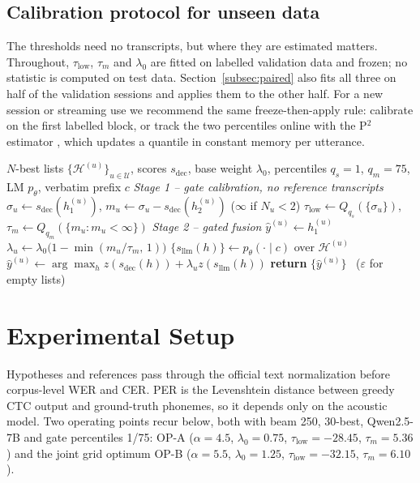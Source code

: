 \documentclass[conference,a4paper,10pt]{IEEEtran}
\begin{document}
\subsection{Calibration protocol for unseen data}\label{subsec:calib}
The thresholds need no transcripts, but where they are estimated matters.
Throughout, $\tau_{\text{low}}$, $\tau_m$ and $\lambda_0$ are fitted on labelled
validation data and frozen; no statistic is computed on test data.
Section~\ref{subsec:paired} also fits all three on half of the validation
sessions and applies them to the other half. For a new session or streaming use we
recommend the same freeze-then-apply rule: calibrate on the first labelled
block, or track the two percentiles online with the P$^2$ estimator
\cite{jain1985p2}, which updates a quantile in constant memory per utterance.

\begin{algorithm}[!t]
\caption{Gated, margin-adaptive LLM score fusion}
\label{alg:fusion}
\footnotesize
\begin{algorithmic}[1]
\Require $N$-best lists $\{\mathcal{H}^{(u)}\}_{u\in\mathcal{U}}$, scores
         $s_{\text{dec}}$, base weight $\lambda_0$, percentiles $q_s{=}1$,
         $q_m{=}75$, LM $p_\theta$, verbatim prefix $c$
\Statex \textit{Stage 1 -- gate calibration, no reference transcripts}
  $\sigma_u \!\gets\! s_{\text{dec}}(h_1^{(u)})$,
  $m_u \!\gets\! \sigma_u\!-\!s_{\text{dec}}(h_2^{(u)})$ ($\infty$ if $N_u{<}2$)
\EndFor
\State $\tau_{\text{low}} \gets Q_{q_s}(\{\sigma_u\})$,\quad
       $\tau_m \gets Q_{q_m}(\{m_u : m_u<\infty\})$
\Statex \textit{Stage 2 -- gated fusion}
     \State $\hat{y}^{(u)} \gets h_1^{(u)}$ 
  \Else
     \State $\lambda_u \gets \lambda_0\big(1-\min(m_u/\tau_m,\,1)\big)$
     \State $\{s_{\text{llm}}(h)\} \gets p_\theta(\cdot \mid c)$ over
            $\mathcal{H}^{(u)}$ 
     \State $\hat{y}^{(u)} \gets \arg\max_{h}
            z(s_{\text{dec}}(h))+\lambda_u z(s_{\text{llm}}(h))$
  \EndIf
\EndFor
\State \textbf{return} $\{\hat{y}^{(u)}\}$ \ ($\varepsilon$ for empty lists)
\end{algorithmic}
\end{algorithm}

\section{Experimental Setup}\label{sec:setup}
Hypotheses and references pass through the official text normalization before
corpus-level WER and CER. PER is the Levenshtein distance between greedy CTC
output and ground-truth phonemes, so it depends only on the acoustic model.
Two operating points recur below, both with beam 250, 30-best, Qwen2.5-7B and
gate percentiles 1/75: OP-A ($\alpha=4.5$, $\lambda_0=0.75$,
$\tau_{\text{low}}=-28.45$, $\tau_m=5.36$) and the joint grid optimum OP-B
($\alpha=5.5$, $\lambda_0=1.25$, $\tau_{\text{low}}=-32.15$, $\tau_m=6.10$).
\end{document}
